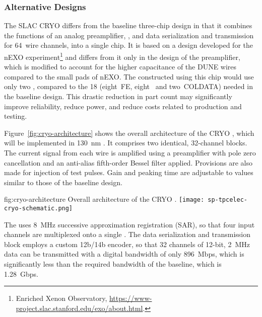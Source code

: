 \subsubsection{Alternative Designs}
\label{sec:fdsp-tpcelec-design-femb-alt}

\label{sec:fdsp-tpcelec-design-femb-alt-cryo}

The SLAC CRYO  differs from the baseline three-chip design in that it combines the functions of an analog preamplifier, , and data serialization and transmission for \num{64}~wire channels, into a single chip.
It is based on a design developed for the nEXO experiment\footnote{Enriched Xenon Observatory, \url{https://www-project.slac.stanford.edu/exo/about.html}.} and differs from it only in the design of the preamplifier, which is modified to account for the higher capacitance of the DUNE  wires compared to the small pads of nEXO.
The  constructed using this chip would use only two , compared to the \num{18} (eight~FE, eight~ and two~COLDATA) needed in the baseline design.
This drastic reduction in part count may significantly improve  reliability, reduce power, and reduce costs related to production and testing. 

Figure~\ref{fig:cryo-architecture} shows the overall architecture of the CRYO , which will be implemented in \SI{130}{nm} .
It comprises two identical, \num{32}-channel blocks. 
The current signal from each wire is amplified using a preamplifier with pole zero cancellation and an anti-alias fifth-order Bessel filter applied. 
Provisions are also made for injection of test pulses. 
Gain and peaking time are adjustable to values similar to those of the baseline design.

\begin{dunefigure}
{fig:cryo-architecture}
{Overall architecture of the CRYO .}
\texttt{[image: sp-tpcelec-cryo-schematic.png]}
\end{dunefigure}

The  uses \SI{8}{MHz} successive approximation registration (SAR), so that four input channels are multiplexed onto a single . The data serialization and transmission block employs a custom 12b/14b encoder, so that \num{32} channels of \num{12}-bit, \SI{2}{MHz} data can be transmitted with a digital bandwidth of only \SI{896}{Mbps}, which is significantly less than the required bandwidth of the baseline, which is \SI{1.28}{Gbps}.

